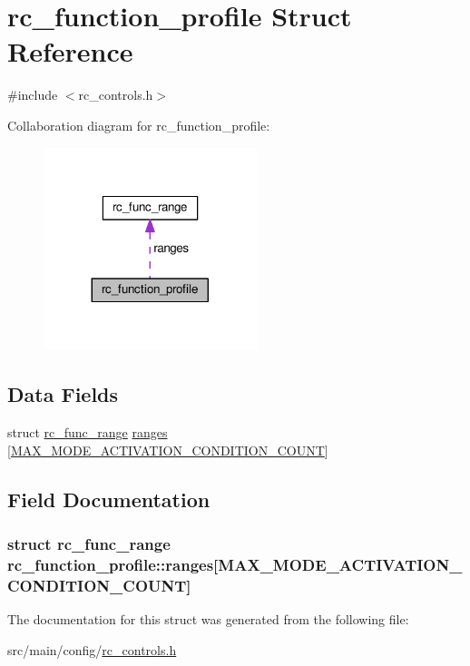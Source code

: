 \hypertarget{structrc__function__profile}{\section{rc\+\_\+function\+\_\+profile Struct Reference}
\label{structrc__function__profile}
}


{\ttfamily \#include $<$rc\+\_\+controls.\+h$>$}



Collaboration diagram for rc\+\_\+function\+\_\+profile\+:\nopagebreak
\begin{figure}[H]
\begin{center}
\leavevmode
\includegraphics[width=176pt]{structrc__function__profile__coll__graph}
\end{center}
\end{figure}
\subsection*{Data Fields}
\begin{DoxyCompactItemize}
\item 
struct \hyperlink{structrc__func__range}{rc\+\_\+func\+\_\+range} \hyperlink{structrc__function__profile_a51e4b255b8160ec730449f1ba4b28e37}{ranges} \mbox{[}\hyperlink{rc__controls_8h_a99bfbfa8c2da6ff3d7c806dd4db019b2}{M\+A\+X\+\_\+\+M\+O\+D\+E\+\_\+\+A\+C\+T\+I\+V\+A\+T\+I\+O\+N\+\_\+\+C\+O\+N\+D\+I\+T\+I\+O\+N\+\_\+\+C\+O\+U\+N\+T}\mbox{]}
\end{DoxyCompactItemize}


\subsection{Field Documentation}
\hypertarget{structrc__function__profile_a51e4b255b8160ec730449f1ba4b28e37}{
\subsubsection[{ranges}]{\setlength{\rightskip}{0pt plus 5cm}struct {\bf rc\+\_\+func\+\_\+range} rc\+\_\+function\+\_\+profile\+::ranges\mbox{[}{\bf M\+A\+X\+\_\+\+M\+O\+D\+E\+\_\+\+A\+C\+T\+I\+V\+A\+T\+I\+O\+N\+\_\+\+C\+O\+N\+D\+I\+T\+I\+O\+N\+\_\+\+C\+O\+U\+N\+T}\mbox{]}}}\label{structrc__function__profile_a51e4b255b8160ec730449f1ba4b28e37}


The documentation for this struct was generated from the following file\+:\begin{DoxyCompactItemize}
\item 
src/main/config/\hyperlink{rc__controls_8h}{rc\+\_\+controls.\+h}\end{DoxyCompactItemize}
